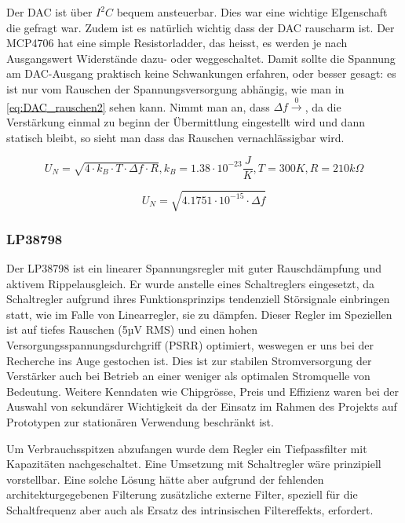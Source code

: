 Der DAC ist über $I^2 C$ bequem ansteuerbar. Dies war eine wichtige EIgenschaft die gefragt war. Zudem ist es natürlich wichtig dass der DAC rauscharm ist. Der MCP4706 hat eine simple Resistorladder, das heisst, es werden je nach Ausgangswert Widerstände dazu- oder weggeschaltet. Damit sollte die Spannung am DAC-Ausgang praktisch keine Schwankungen erfahren, oder besser gesagt: es ist nur vom Rauschen der Spannungsversorgung abhängig, wie man in \ref{eq:DAC_rauschen2} sehen kann. Nimmt man an, dass $\Delta f \xrightarrow 0$, da die Verstärkung einmal zu beginn der Übermittlung eingestellt wird und dann statisch bleibt, so sieht man dass das Rauschen vernachlässigbar wird.

\begin{equation}
    U_N = \sqrt{4 \cdot k_B \cdot T \cdot \Delta f \cdot R}, k_B = 1.38\cdot 10^{-23}\frac{J}{K}, T = 300K, R = 210k\Omega
\label{eq:DAC_rauschen}
\end{equation}

\begin{equation}
    U_N = \sqrt{4.1751\cdot 10^{-15} \cdot \Delta f}
\label{eq:DAC_rauschen2}
\end{equation}

\subsubsection{LP38798}
Der LP38798 ist ein linearer Spannungsregler mit guter Rauschdämpfung und aktivem Rippelausgleich. Er wurde anstelle eines Schaltreglers eingesetzt, da Schaltregler aufgrund ihres Funktionsprinzips tendenziell Störsignale einbringen statt, wie im Falle von Linearregler, sie zu dämpfen.
Dieser Regler im Speziellen ist auf tiefes Rauschen (5µV RMS) und einen hohen Versorgungsspannungsdurchgriff (PSRR) optimiert, weswegen er uns bei der Recherche ins Auge gestochen ist. Dies ist zur stabilen Stromversorgung der Verstärker auch bei Betrieb an einer weniger als optimalen Stromquelle von Bedeutung.
Weitere Kenndaten wie Chipgrösse, Preis und Effizienz waren bei der Auswahl von sekundärer Wichtigkeit da der Einsatz im Rahmen des Projekts auf Prototypen zur stationären Verwendung beschränkt ist.


Um Verbrauchsspitzen abzufangen wurde dem Regler ein Tiefpassfilter mit Kapazitäten nachgeschaltet.
Eine Umsetzung mit Schaltregler wäre prinzipiell vorstellbar. Eine solche Lösung hätte aber aufgrund der fehlenden architekturgegebenen Filterung zusätzliche externe Filter, speziell für die Schaltfrequenz aber auch als Ersatz des intrinsischen Filtereffekts, erfordert.

